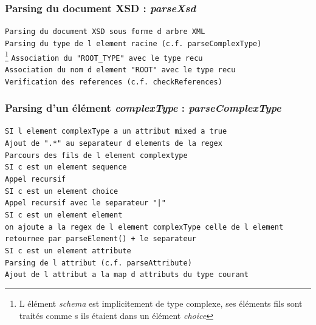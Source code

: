 	\subsubsection{Parsing du document XSD : \textit{parseXsd}}
		\lstinline$Parsing du document XSD sous forme d arbre XML$\\
		\lstinline$Parsing du type de l element racine (c.f. parseComplexType)$\\ \footnote{L élément \textit{schema} est implicitement de type complexe, ses éléments fils sont traités comme s ils étaient dans un élément \textit{choice}}
		\lstinline$Association du "ROOT_TYPE" avec le type recu$\\
		\lstinline$Association du nom d element "ROOT" avec le type recu$\\
		\lstinline$Verification des references (c.f. checkReferences)$\\

	\subsubsection{Parsing d'un élément \textit{complexType} : \textit{parseComplexType}}
		\lstinline$SI l element complexType a un attribut mixed a true$\\
		\indent \lstinline$Ajout de ".*" au separateur d elements de la regex$\\

		\lstinline$Parcours des fils de l element complextype$\\
		\indent \lstinline$SI c est un element sequence$\\
		\indent \indent \lstinline$Appel recursif$\\
		\indent \lstinline$SI c est un element choice$\\
		\indent \indent \lstinline$Appel recursif avec le separateur "|"$\\
		\indent \lstinline$SI c est un element element$\\
		\indent \indent \lstinline$on ajoute a la regex de l element complexType celle de l element retournee par parseElement() + le separateur$\\
		\indent \lstinline$SI c est un element attribute$\\
		\indent \indent \lstinline$Parsing de l attribut (c.f. parseAttribute)$\\
		\indent \indent \lstinline$Ajout de l attribut a la map d attributs du type courant$\\

